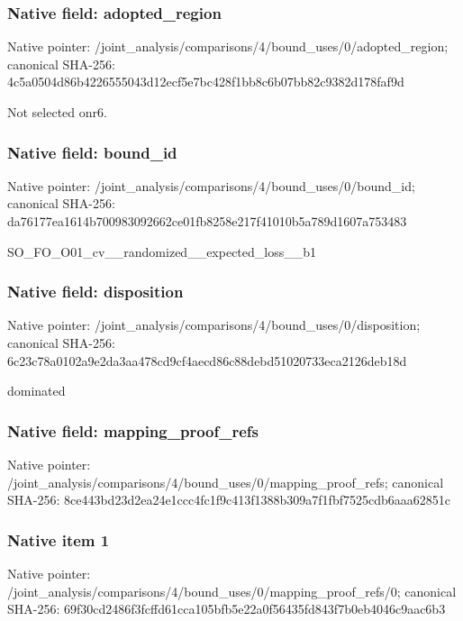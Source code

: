 \documentclass[10pt,a4paper]{article}
\begin{document}
\subsubsection{Native field: adopted\_\allowbreak{}region}
Native pointer: /joint\_\allowbreak{}analysis/comparisons/4/bound\_\allowbreak{}uses/0/adopted\_\allowbreak{}region; canonical SHA-256: 4c5a0504d86b4226555043d12ecf5e7bc428f1bb8c6b07bb82c9382d178faf9d

\begingroup\raggedright\sloppy Not selected onr6.\par\endgroup

\subsubsection{Native field: bound\_\allowbreak{}id}
Native pointer: /joint\_\allowbreak{}analysis/comparisons/4/bound\_\allowbreak{}uses/0/bound\_\allowbreak{}id; canonical SHA-256: da76177ea1614b700983092662ce01fb8258e217f41010b5a789d1607a753483

\begingroup\raggedright\sloppy SO\_\allowbreak{}FO\_\allowbreak{}O01\_\allowbreak{}cv\_\allowbreak{}\_\allowbreak{}randomized\_\allowbreak{}\_\allowbreak{}expected\_\allowbreak{}loss\_\allowbreak{}\_\allowbreak{}b1\par\endgroup

\subsubsection{Native field: disposition}
Native pointer: /joint\_\allowbreak{}analysis/comparisons/4/bound\_\allowbreak{}uses/0/disposition; canonical SHA-256: 6c23c78a0102a9e2da3aa478cd9cf4aecd86c88debd51020733eca2126deb18d

\begingroup\raggedright\sloppy dominated\par\endgroup

\subsubsection{Native field: mapping\_\allowbreak{}proof\_\allowbreak{}refs}
Native pointer: /joint\_\allowbreak{}analysis/comparisons/4/bound\_\allowbreak{}uses/0/mapping\_\allowbreak{}proof\_\allowbreak{}refs; canonical SHA-256: 8ce443bd23d2ea24e1ccc4fc1f9c413f1388b309a7f1fbf7525cdb6aaa62851c

\subsubsection{Native item 1}
Native pointer: /joint\_\allowbreak{}analysis/comparisons/4/bound\_\allowbreak{}uses/0/mapping\_\allowbreak{}proof\_\allowbreak{}refs/0; canonical SHA-256: 69f30cd2486f3fcffd61cca105bfb5e22a0f56435fd843f7b0eb4046c9aac6b3
\end{document}
